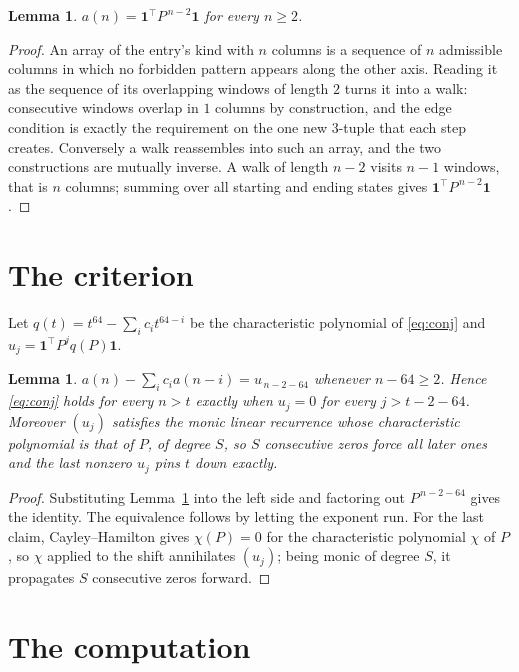 \documentclass[11pt,a4paper]{article}
\theoremstyle{plain}
\newtheorem{lemma}[theorem]{Lemma}
\theoremstyle{definition}
\begin{document}
\begin{lemma}\label{lem:walk}
$a(n)=\mathbf{1}^{\!\top}P^{\,n-2}\mathbf{1}$ for every $n\ge2$.
\end{lemma}

\begin{proof}
An array of the entry's kind with $n$ columns is a sequence of $n$ admissible columns in
which no forbidden pattern appears along the other axis. Reading it as the sequence of its
overlapping windows of length $2$ turns it into a walk: consecutive windows overlap in
$1$ columns by construction, and the edge condition is exactly the requirement on the one
new $3$-tuple that each step creates. Conversely a walk reassembles into such an array,
and the two constructions are mutually inverse. A walk of length $n-2$ visits $n-1$
windows, that is $n$ columns; summing over all starting and ending states gives
$\mathbf{1}^{\!\top}P^{\,n-2}\mathbf{1}$.
\end{proof}

\section{The criterion}

Let $q(t)=t^{64}-\sum_i c_i t^{64-i}$ be the characteristic polynomial of
\eqref{eq:conj} and $u_j=\mathbf{1}^{\!\top}P^{j}q(P)\mathbf{1}$.

\begin{lemma}\label{lem:crit}
$a(n)-\sum_i c_i a(n-i)=u_{\,n-2-64}$ whenever $n-64\ge2$. Hence
\eqref{eq:conj} holds for every $n>t$ exactly when $u_j=0$ for every
$j>t-2-64$. Moreover $(u_j)$ satisfies the monic linear recurrence whose
characteristic polynomial is that of $P$, of degree $S$, so $S$ consecutive zeros force all
later ones and the last nonzero $u_j$ pins $t$ down exactly.
\end{lemma}

\begin{proof}
Substituting Lemma~\ref{lem:walk} into the left side and factoring out
$P^{\,n-2-64}$ gives the identity. The equivalence follows by letting the exponent
run. For the last claim, Cayley--Hamilton gives $\chi(P)=0$ for the characteristic
polynomial $\chi$ of $P$, so $\chi$ applied to the shift annihilates $(u_j)$; being monic of
degree $S$, it propagates $S$ consecutive zeros forward.
\end{proof}

\section{The computation}
\end{document}
